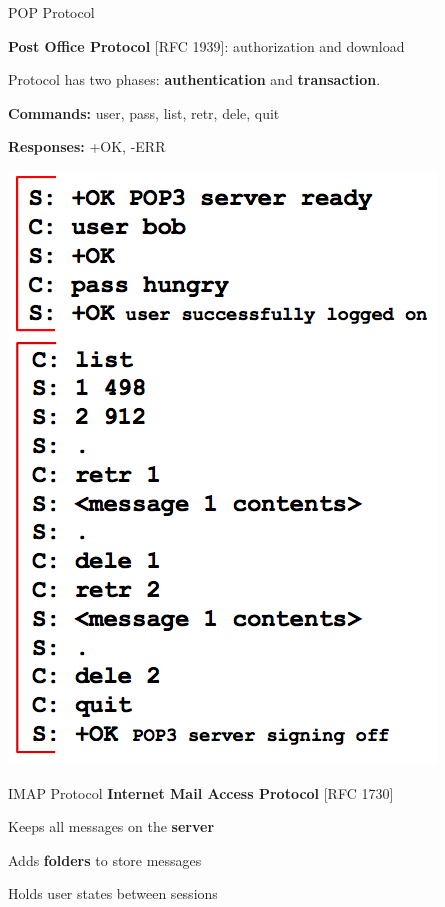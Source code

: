 \begin{topic}{POP Protocol}
\begin{multicols}{2}
\textbf{Post Office Protocol} [RFC 1939]: authorization and download

Protocol has two phases: \textbf{authentication} and \textbf{transaction}.

\textbf{Commands:} user, pass, list, retr, dele, quit

\textbf{Responses:} +OK, -ERR

\columnbreak

\includegraphics[scale=0.35]{coms3200/images/pop}
\end{multicols}
\end{topic}

\begin{topic}{IMAP Protocol}
\textbf{Internet Mail Access Protocol} [RFC 1730]

Keeps all messages on the \textbf{server}

Adds \textbf{folders} to store messages

Holds user states between sessions
\end{topic}
